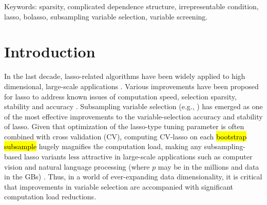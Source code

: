 \documentclass[12pt]{article}
\begin{document}
\noindent
\normalsize
Keywords: sparsity, complicated dependence structure, irrepresentable condition, lasso, bolasso, subsampling variable selection, variable screening.

\vfill
\newpage
{}


\clearpage
{}

\section{Introduction}

In the last decade, lasso-related algorithms have been widely applied to high dimensional, large-scale applications \citep{efronall04, friedman2007pathwise, friedman2010regularization}. Various improvements have been proposed for lasso to address known issues of computation speed, selection sparsity, stability and accuracy \citep{weisberg04, lim2016estimation}. Subsampling variable selection (e.g., \citet{bach2008bolasso, meinshausen2010stability}) has emerged as one of the most effective improvements to the variable-selection accuracy and stability of lasso. Given that optimization of the lasso-type tuning parameter is often combined with cross validation (CV), computing CV-lasso on each \hl{bootstrap subsample} hugely magnifies the computation load, making any subsampling-based lasso variants less attractive in large-scale applications such as computer vision and natural language processing (where $p$ may be in the millions and data in the GBs) \citep{xu2012asymptotic}. Thus, in a world of ever-expanding data dimensionality, it is critical that improvements in variable selection are accompanied with significant computation load reductions.
\end{document}
